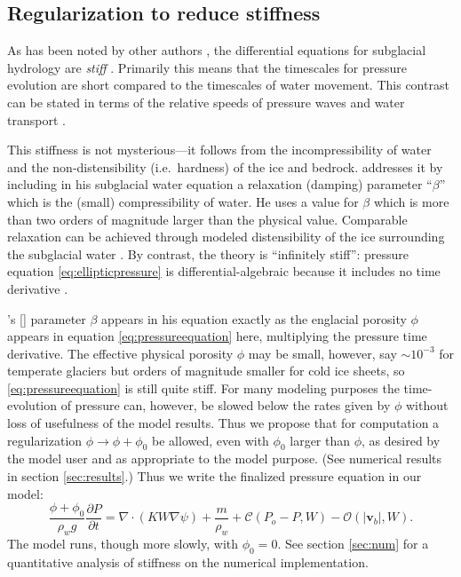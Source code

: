 \documentclass[11pt,final]{amsart}
\newcommand\bv{\mathbf{v}}
\newcommand{\Div}{\nabla\cdot}
\newcommand{\grad}{\nabla}
\newcommand{\citeapos}[1]{\citeauthor{#1}'s [\citeyear{#1}]}
\begin{document}
\subsection*{Regularization to reduce stiffness}  As has been noted by other authors \citep{Clarke2003,Schoofetal2012}, the differential equations for subglacial hydrology are \emph{stiff} \citep{AscherPetzold}.  Primarily  this means that the timescales for pressure evolution are short compared to the timescales of water movement.  This contrast can be stated in terms of the relative speeds of pressure waves and water transport \citep[Appendix A, for example]{Clarke2003}.

This stiffness is not mysterious---it follows from the incompressibility of water and the non-distensibility (i.e.~hardness) of the ice and bedrock.  \cite{Clarke2003} addresses it by including in his subglacial water equation a relaxation (damping) parameter  ``$\beta$'' which is the (small) compressibility of water.  He uses a value for $\beta$ which is more than two orders of magnitude larger than the physical value.  Comparable relaxation can be achieved through modeled distensibility of the ice surrounding the subglacial water \citep[Appendix A]{Clarke2003}.  By contrast, the \cite{Schoofetal2012} theory is ``infinitely stiff'': pressure equation \eqref{eq:ellipticpressure} is differential-algebraic because it includes no time derivative \citep{AscherPetzold}.

\citeapos{Clarke2003} parameter $\beta$ appears in his equation exactly as the englacial porosity $\phi$ appears in equation \eqref{eq:pressureequation} here, multiplying the pressure time derivative.  The effective physical porosity $\phi$ may be small, however, say $\sim 10^{-3}$ for temperate glaciers but orders of magnitude smaller for cold ice sheets, so \eqref{eq:pressureequation} is still quite stiff.  For many modeling purposes the time-evolution of pressure can, however, be slowed below the rates given by $\phi$ without loss of usefulness of the model results.  Thus we propose that for computation a regularization $\phi \to \phi+\phi_0$ be allowed, even with $\phi_0$ larger than $\phi$, as desired by the model user and as appropriate to the model purpose.  (See numerical results in section \ref{sec:results}.)  Thus we write the finalized pressure equation in our model:
\begin{equation}
\frac{\phi+\phi_0}{\rho_w g} \frac{\partial P}{\partial t} = \Div \left(K W \grad \psi \right) + \frac{m}{\rho_w} + \mathcal{C}(P_o-P,W) - \mathcal{O}(|\bv_b|,W). \label{eq:regpressureequation}
\end{equation}
The model runs, though more slowly, with $\phi_0=0$.  See section \ref{sec:num} for a quantitative analysis of stiffness on the numerical implementation.
\end{document}
